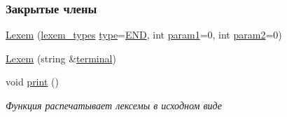 \subsubsection*{Закрытые члены}
\begin{DoxyCompactItemize}
\item 
\hyperlink{class_lexem_a707b1ec3c3640fb40e8ac69e7b0aac63}{Lexem} (\hyperlink{class_lexem_af335177220e991d190a36fabef7ecbf4}{lexem\+\_\+types} \hyperlink{class_lexem_ad60447d5e5f83d8c95d3f658930ab13d}{type}=\hyperlink{class_lexem_af335177220e991d190a36fabef7ecbf4a45577586a792f3738569d22ff9192976}{E\+N\+D}, int \hyperlink{class_lexem_af0a7790d19219952191379409afa505e}{param1}=0, int \hyperlink{class_lexem_a2a89063a544c399b2dfc9a775e94b13b}{param2}=0)
\item 
\hyperlink{class_lexem_a8c81179e58f3d67b43fb92959dec0476}{Lexem} (string \&\hyperlink{class_lexem_a2d5cea0d9f7cbaf5edd5973991d0da7a}{terminal})
\item 
\hypertarget{class_lexem_ab863374b860c4eb4c150ddb8748a206d}{}void \hyperlink{class_lexem_ab863374b860c4eb4c150ddb8748a206d}{print} ()\label{class_lexem_ab863374b860c4eb4c150ddb8748a206d}

\begin{DoxyCompactList}\small\item\em Функция распечатывает лексемы в исходном виде \end{DoxyCompactList}\end{DoxyCompactItemize}
